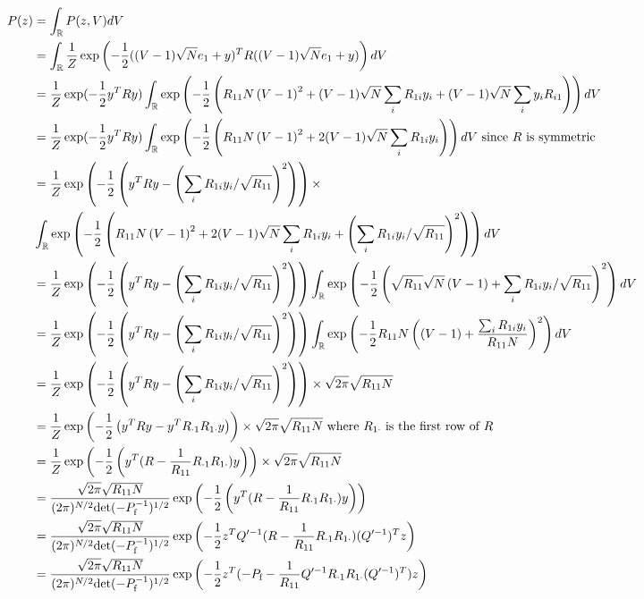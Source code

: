 \documentclass{article}
\begin{document}
\begin{align*}
P(z)&=\int_\R P(z,V)dV
\\&=\int_\R \frac{1}{Z}\exp\left(-\frac{1}{2}((V-1)\sqrt{N}e_1+y)^TR((V-1)\sqrt{N}e_1+y)\right)dV
\\&=\frac{1}{Z}\exp(-\frac{1}{2}y^TRy)\int_\R \exp\left(-\frac{1}{2}\left(R_{11}N\left(V-1\right)^2+(V-1)\sqrt{N}\sum_iR_{1i}y_i+(V-1)\sqrt{N}\sum_iy_iR_{i1}\right)\right)dV
\\&=\frac{1}{Z}\exp(-\frac{1}{2}y^TRy)\int_\R \exp\left(-\frac{1}{2}\left(R_{11}N\left(V-1\right)^2+2(V-1)\sqrt{N}\sum_iR_{1i}y_i\right)\right)dV \text{ since $R$ is symmetric }
\\&=\frac{1}{Z}\exp\left(-\frac{1}{2}\left(y^TRy-\left(\sum_iR_{1i}y_i/\sqrt{R_{11}}\right)^2\right)\right)\times
\\&\int_\R \exp\left(-\frac{1}{2}\left(R_{11}N\left(V-1\right)^2+2(V-1)\sqrt{N}\sum_iR_{1i}y_i+\left(\sum_iR_{1i}y_i/\sqrt{R_{11}}\right)^2\right)\right)dV
\\&=\frac{1}{Z}\exp\left(-\frac{1}{2}\left(y^TRy-\left(\sum_iR_{1i}y_i/\sqrt{R_{11}}\right)^2\right)\right)\int_\R \exp\left(-\frac{1}{2}\left(\sqrt{R_{11}}\sqrt{N}\left(V-1\right)+\sum_iR_{1i}y_i/\sqrt{R_{11}}\right)^2\right)dV
\\&=\frac{1}{Z}\exp\left(-\frac{1}{2}\left(y^TRy-\left(\sum_iR_{1i}y_i/\sqrt{R_{11}}\right)^2\right)\right)\int_\R \exp\left(-\frac{1}{2}R_{11}N\left(\left(V-1\right)+\frac{\sum_iR_{1i}y_i}{R_{11}N}\right)^2\right)dV
\\&=\frac{1}{Z}\exp\left(-\frac{1}{2}\left(y^TRy-\left(\sum_iR_{1i}y_i/\sqrt{R_{11}}\right)^2\right)\right)\times\sqrt{2\pi}\sqrt{R_{11}N}
\\&=\frac{1}{Z}\exp\left(-\frac{1}{2}\left(y^TRy-y^TR_{\cdot 1}R_{1\cdot}y\right)\right)\times\sqrt{2\pi}\sqrt{R_{11}N} \text{ where $R_{1\cdot}$ is the first row of $R$}
\\&=\frac{1}{Z}\exp\left(-\frac{1}{2}\left(y^T(R-\frac{1}{R_{11}}R_{\cdot 1}R_{1\cdot})y\right)\right)\times\sqrt{2\pi}\sqrt{R_{11}N}
\\&=\frac{\sqrt{2\pi}\sqrt{R_{11}N}}{(2\pi)^{N/2}\det(-P_\text{f}^{-1})^{1/2}}\exp\left(-\frac{1}{2}\left(y^T(R-\frac{1}{R_{11}}R_{\cdot 1}R_{1\cdot})y\right)\right)
\\&=\frac{\sqrt{2\pi}\sqrt{R_{11}N}}{(2\pi)^{N/2}\det(-P_\text{f}^{-1})^{1/2}}\exp\left(-\frac{1}{2}z^TQ'^{-1}(R-\frac{1}{R_{11}}R_{\cdot 1}R_{1\cdot})(Q'^{-1})^Tz\right)
\\&=\frac{\sqrt{2\pi}\sqrt{R_{11}N}}{(2\pi)^{N/2}\det(-P_\text{f}^{-1})^{1/2}}\exp\left(-\frac{1}{2}z^T(-P_\text{f}-\frac{1}{R_{11}}Q'^{-1}R_{\cdot 1}R_{1\cdot}(Q'^{-1})^T)z\right)

\end{align*}
\end{document}
